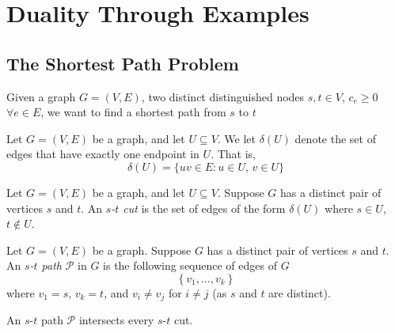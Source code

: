 \chapter{Duality Through Examples}
\section{The Shortest Path Problem}
Given a graph $ G=(V,E) $, two distinct distinguished nodes $ s,t\in V $,
$ c_e\geqslant  0 $ $ \forall e\in E $, we want to find a shortest path from $s$ to $t$

\begin{defbox}
    \begin{definition}
            Let $ G=(V,E) $ be a graph, and let $ U\subseteq V $. We
            let $ \delta(U) $ denote the set of edges that have exactly
            one endpoint in $ U $. That is,
            \[ \delta(U)=\{uv\in E:u\in U,\,v\in U\} \]
    \end{definition}
\end{defbox}

\begin{defbox}
    \begin{definition}
        Let $ G=(V,E) $ be a graph, and let $ U\subseteq V $.
        Suppose $ G $ has a distinct pair of vertices $ s $ and $ t $.
        An \emph{$s$-$t$ cut} is the set of edges of the form $ \delta(U) $
        where $ s\in U $, $ t\notin U $.
    \end{definition}
\end{defbox}

\begin{defbox}
    \begin{definition}
        Let $ G=(V,E) $ be a graph. Suppose $ G $ has a distinct pair of vertices $ s $ and $ t $.
        An \emph{$s$-$t$ path} $\mathcal{P}$ in $ G $ is the following sequence of edges of $G$
        \[ \left\{v_1,\ldots,v_{k}\right\} \]
        where $ v_1=s $, $ v_k=t $, and $ v_i\neq v_j $ for $ i\neq j $
        (as $ s $ and $ t $ are distinct).
    \end{definition}
\end{defbox}

\begin{thmbox}
    \begin{theorem}
        An $s$-$t$ path $ \mathcal{P} $ intersects every $s$-$t$ cut.
    \end{theorem}
\end{thmbox}

